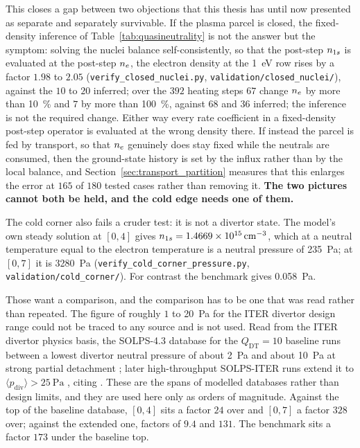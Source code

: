 This closes a gap between two objections that this thesis has until now
presented as separate and separately survivable. If the plasma parcel is closed,
the fixed-density inference of Table~\ref{tab:quasineutrality} is not the answer
but the symptom: solving the nuclei balance self-consistently, so that the
post-step $n_{1s}$ is evaluated at the post-step $n_e$, the electron density at
the \SI{1}{\electronvolt} row rises by a factor $1.98$ to $2.05$
(\texttt{verify\_closed\_nuclei.py}, \texttt{validation/closed\_nuclei/}),
against the $10$ to $20$ inferred; over the $392$ heating steps $67$ change
$n_e$ by more than \SI{10}{\percent} and $7$ by more than \SI{100}{\percent},
against $68$ and $36$ inferred; the inference is not the required change.
Either way every rate coefficient in a fixed-density post-step
operator is evaluated at the wrong density there. If instead the parcel is fed
by transport, so that $n_e$ genuinely does stay fixed while the neutrals are
consumed, then the ground-state history is set by the influx rather than by the
local balance, and Section~\ref{sec:transport_partition} measures that this
enlarges the error at $165$ of $180$ tested cases rather than removing it.
\textbf{The two pictures cannot both be held, and the cold edge needs one of
them.}

The cold corner also fails a cruder test: it is not a divertor state. The
model's own steady solution at $[0,4]$ gives
$n_{1s} = \SI{1.4669e15}{\per\cubic\centi\metre}$, which at a neutral temperature
equal to the electron temperature is a neutral pressure of \SI{235}{\pascal};
at $[0,7]$ it is \SI{3280}{\pascal}
(\texttt{verify\_cold\_corner\_pressure.py},
\texttt{validation/cold\_corner/}). For contrast the benchmark gives
\SI{0.058}{\pascal}.

Those want a comparison, and the comparison has to be one that was read rather
than repeated. The figure of roughly $1$ to \SI{20}{\pascal} for the ITER
divertor design range could not be traced to any source and is not used. Read from the ITER divertor physics basis, the
SOLPS-4.3 database for the $Q_{\mathrm{DT}} = 10$ baseline runs between a lowest
divertor neutral pressure of about \SI{2}{\pascal} and about
\SI{10}{\pascal} at strong partial detachment
\cite[Secs.~3.1.3, 4]{Pitts2019}; later high-throughput SOLPS-ITER runs extend
it to $\langle p_{\mathrm{div}}\rangle > \SI{25}{\pascal}$
\cite[Sec.~6]{Stangeby2023a}, citing \cite{Lore2022}. These are the spans of
modelled databases rather than design limits, and they are used here only as
orders of magnitude. Against the top of the baseline database, $[0,4]$ sits a
factor $24$ over and $[0,7]$ a factor $328$ over; against the extended one,
factors of $9.4$ and $131$. The benchmark sits a factor $173$ under the
baseline top.

